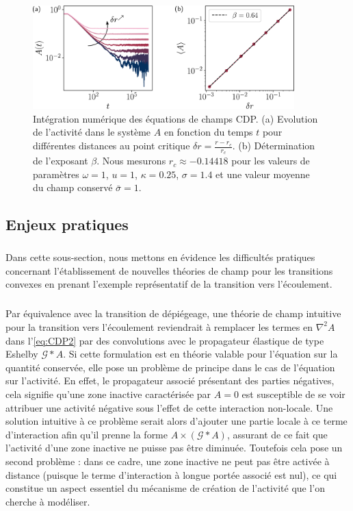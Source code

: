 \begin{figure}[h]
	\centering
	\includegraphics[width=0.9\textwidth]{Chapitre6/Figures/betaCDP_Langevin.pdf}
	\caption{Intégration numérique des équations de champs CDP. (a) Evolution de l'activité dans le système $ A $ en fonction du temps $t$ pour différentes distances au point critique $\delta r = \frac{r-r_c}{r_c}$. (b) Détermination de l'exposant $\beta$. Nous mesurons $r_c \approx -0.14418$ pour les valeurs de paramètres $\omega = 1$, $u = 1$, $\kappa = 0.25$, $\sigma = 1.4$ et une valeur moyenne du champ conservé $\bar{\sigma} = 1$.}
	\label{fig:TestDornicCDP}
\end{figure}

\subsection{Enjeux pratiques}

\subparagraph{}Dans cette sous-section, nous mettons en évidence les difficultés pratiques concernant l'établissement de nouvelles théories de champ pour les transitions convexes en prenant l'exemple représentatif de la transition vers l'écoulement.

\subparagraph{}Par équivalence avec la transition de dépiégeage, une théorie de champ intuitive pour la transition vers l'écoulement reviendrait à remplacer les termes en $\nabla^2 A$ dans l'\autoref{eq:CDP2} par des convolutions avec le propagateur élastique de type Eshelby $\mathcal{G}\ast A$. Si cette formulation est en théorie valable pour l'équation sur la quantité conservée, elle pose un problème de principe dans le cas de l'équation sur l'activité. En effet, le propagateur associé présentant des parties négatives, cela signifie qu'une zone inactive caractérisée par $A = 0$ est susceptible de se voir attribuer une activité négative sous l'effet de cette interaction non-locale. Une solution intuitive à ce problème serait alors d'ajouter une partie locale à ce terme d'interaction afin qu'il prenne la forme $A\times (\mathcal{G}\ast A)$, assurant de ce fait que l'activité d'une zone inactive ne puisse pas être diminuée. Toutefois cela pose un second problème : dans ce cadre, une zone inactive ne peut pas être activée à distance (puisque le terme d'interaction à longue portée associé est nul), ce qui constitue un aspect essentiel du mécanisme de création de l'activité que l'on cherche à modéliser.

